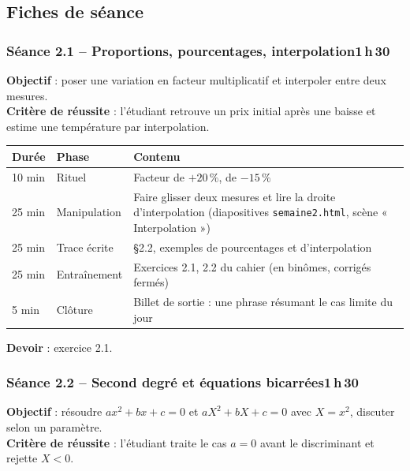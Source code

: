 \documentclass[10.5pt,a4paper]{article}
\newif\ifprof
\newcommand{\profonly}[1]{\ifprof #1\fi}
\begin{document}
\subsection{Fiches de séance}
\subsubsection*{\textcolor{marine}{Séance 2.1 -- Proportions, pourcentages, interpolation}\hfill\normalfont\small\textcolor{ardoise}{1\,h\,30}}
\begin{objectif}\textbf{Objectif} : poser une variation en facteur multiplicatif et interpoler entre deux mesures.\\\textbf{Critère de réussite} : l'étudiant retrouve un prix initial après une baisse et estime une température par interpolation.\end{objectif}\nopagebreak
\begin{longtable}{@{}p{1.1cm}p{2.4cm}p{12.4cm}@{}}
\toprule \textbf{Durée} & \textbf{Phase} & \textbf{Contenu}\\ \midrule\endhead
10 min & Rituel & Facteur de $+20\,\%$, de $-15\,\%$\\
25 min & Manipulation & Faire glisser deux mesures et lire la droite d'interpolation (diapositives \texttt{semaine2.html}, scène « Interpolation »)\\
25 min & Trace écrite & \S2.2, exemples de pourcentages et d'interpolation\\
25 min & Entraînement & Exercices 2.1, 2.2 du cahier (en binômes, corrigés fermés)\\
5 min & Clôture & Billet de sortie : une phrase résumant le cas limite du jour\\ \bottomrule\end{longtable}\nopagebreak
\textbf{Devoir} : exercice 2.1.\profonly{ \textbf{Point de vigilance} : Hausse de $20\,\%$ puis baisse de $20\,\%$ n'est pas neutre : à faire constater par le calcul.}\par
{}\subsubsection*{\textcolor{marine}{Séance 2.2 -- Second degré et équations bicarrées}\hfill\normalfont\small\textcolor{ardoise}{1\,h\,30}}
\begin{objectif}\textbf{Objectif} : résoudre $ax^2+bx+c=0$ et $aX^2+bX+c=0$ avec $X=x^2$, discuter selon un paramètre.\\\textbf{Critère de réussite} : l'étudiant traite le cas $a=0$ avant le discriminant et rejette $X<0$.\end{objectif}\nopagebreak
\end{document}
